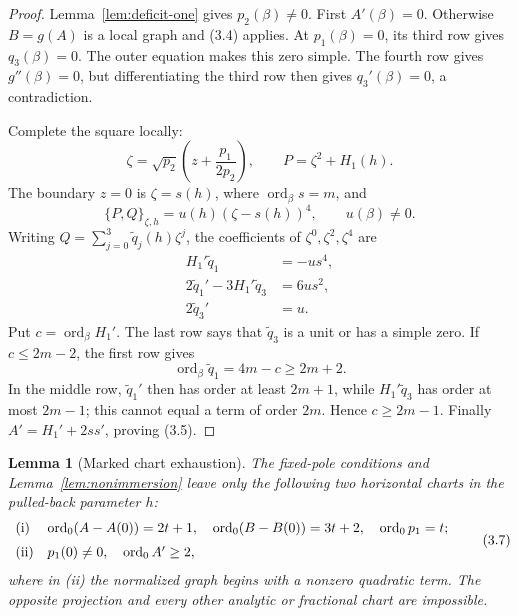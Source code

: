 \documentclass[11pt]{article}
\newtheorem{lemma}[theorem]{Lemma}
\theoremstyle{definition}
\theoremstyle{remark}
\newcommand{\ord}{\operatorname{ord}}
\begin{document}
\begin{proof}
Lemma~\ref{lem:deficit-one} gives \(p_2(\beta)\ne0\).  First
\(A'(\beta)=0\).  Otherwise \(B=g(A)\) is a local graph and (3.4)
applies.  At \(p_1(\beta)=0\), its third row gives \(q_3(\beta)=0\).
The outer equation makes this zero simple.  The fourth row gives
\(g''(\beta)=0\), but differentiating the third row then gives
\(q_3'(\beta)=0\), a contradiction.

Complete the square locally:
\[
 \zeta=\sqrt{p_2}\left(z+\frac{p_1}{2p_2}\right),\qquad
 P=\zeta^2+H_1(h).
\]
The boundary \(z=0\) is \(\zeta=s(h)\), where
\(\ord_\beta s=m\), and
\[
 \{P,Q\}_{\zeta,h}=u(h)(\zeta-s(h))^4,\qquad u(\beta)\ne0.
\]
Writing \(Q=\sum_{j=0}^3\widetilde q_j(h)\zeta^j\), the coefficients
of \(\zeta^0,\zeta^2,\zeta^4\) are
\[
\begin{aligned}
H_1'\widetilde q_1&=-us^4,\\
2\widetilde q_1'-3H_1'\widetilde q_3&=6us^2,\\
2\widetilde q_3'&=u.                                   \tag{3.6}
\end{aligned}
\]
Put \(c=\ord_\beta H_1'\).  The last row says that
\(\widetilde q_3\) is a unit or has a simple zero.  If
\(c\le2m-2\), the first row gives
\[
\ord_\beta\widetilde q_1=4m-c\ge2m+2.
\]
In the middle row, \(\widetilde q_1'\) then has order at least
\(2m+1\), while \(H_1'\widetilde q_3\) has order at most \(2m-1\);
this cannot equal a term of order \(2m\).  Hence \(c\ge2m-1\).
Finally \(A'=H_1'+2ss'\), proving (3.5).
\end{proof}

\begin{lemma}[Marked chart exhaustion]\label{lem:charts}
The fixed-pole conditions and Lemma~\ref{lem:nonimmersion} leave only the
following two horizontal charts in the pulled-back parameter \(h\):
\[
\begin{array}{ll}
\text{\rm(i)}&
\ord_0(A-A(0))=2t+1,\quad
\ord_0(B-B(0))=3t+2,\quad
\ord_0p_1=t;\\[2mm]
\text{\rm(ii)}&
p_1(0)\ne0,\quad \ord_0 A'\ge2,
\end{array}                                             \tag{3.7}
\]
where in (ii) the normalized graph begins with a nonzero quadratic
term.  The opposite projection and every other analytic or fractional
chart are impossible.
\end{lemma}
\end{document}
